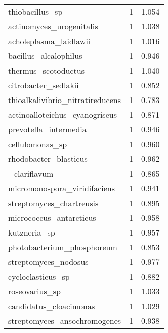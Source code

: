 \begin{tabular}{lrr}
                             thiobacillus\_sp &                   1 &     1.054 \\
                    actinomyces\_urogenitalis &                   1 &     1.038 \\
                      acholeplasma\_laidlawii &                   1 &     1.016 \\
                       bacillus\_alcalophilus &                   1 &     0.946 \\
                         thermus\_scotoductus &                   1 &     1.040 \\
                        citrobacter\_sedlakii &                   1 &     0.852 \\
            thioalkalivibrio\_nitratireducens &                   1 &     0.783 \\
              actinoalloteichus\_cyanogriseus &                   1 &     0.871 \\
                       prevotella\_intermedia &                   1 &     0.946 \\
                             cellulomonas\_sp &                   1 &     0.960 \\
                       rhodobacter\_blasticus &                   1 &     0.962 \\
                   [clostridium]\_clariflavum &                   1 &     0.865 \\
                micromonospora\_viridifaciens &                   1 &     0.941 \\
                    streptomyces\_chartreusis &                   1 &     0.895 \\
                     micrococcus\_antarcticus &                   1 &     0.958 \\
                                kutzneria\_sp &                   1 &     0.957 \\
                  photobacterium\_phosphoreum &                   1 &     0.853 \\
                        streptomyces\_nodosus &                   1 &     0.977 \\
                           cycloclasticus\_sp &                   1 &     0.882 \\
                              roseovarius\_sp &                   1 &     1.033 \\
                      candidatus\_cloacimonas &                   1 &     1.029 \\
                streptomyces\_ansochromogenes &                   1 &     0.938 \\

\end{tabular}

